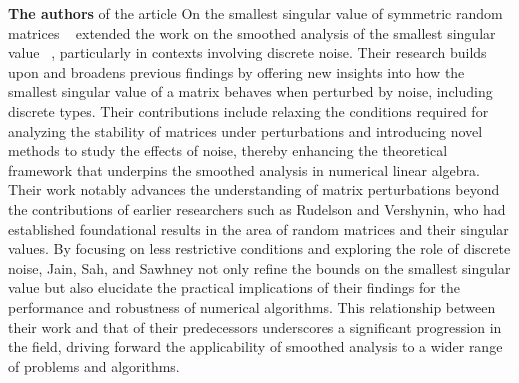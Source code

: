 \textbf{The authors} of the article On the smallest singular value of symmetric random matrices ~\cite{jain2020smallest} extended the work on the smoothed analysis of the smallest singular value ~\cite{jain2020smoothed}, particularly in contexts involving discrete noise. 
Their research builds upon and broadens previous findings by offering new insights into how the smallest singular value of a matrix behaves when perturbed by noise, including discrete types. 
Their contributions include relaxing the conditions required for analyzing the stability of matrices under perturbations and introducing novel methods to study the effects of noise, thereby enhancing the theoretical framework that underpins the smoothed analysis in numerical linear algebra.\\
Their work notably advances the understanding of matrix perturbations beyond the contributions of earlier researchers such as Rudelson and Vershynin, who had established foundational results in the area of random matrices and their singular values. By focusing on less restrictive conditions and exploring the role of discrete noise, Jain, Sah, and Sawhney not only refine the bounds on the smallest singular value but also elucidate the practical implications of their findings for the performance and robustness of numerical algorithms. This relationship between their work and that of their predecessors underscores a significant progression in the field, driving forward the applicability of smoothed analysis to a wider range of problems and algorithms.\\\\

